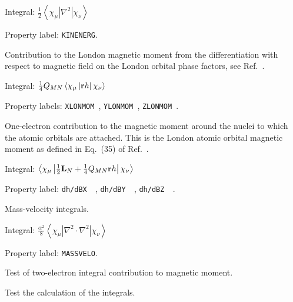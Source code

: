 \begin{description}
\begin{list}{}{}
\item Integral:
$\frac{1}{2}\left<\chi_{\mu}\left|\nabla^{2}\right|\chi_{\nu}\right>$
\item Property label: \verb|KINENERG|.
\end{list}

\item[\Key{LONMOM}] Contribution to the London magnetic
moment from
the differentiation with respect to magnetic field on the London
orbital phase factors, see Ref.~\cite{thpjjcp95}.

\begin{list}{}{}
\item Integral:
$\frac{1}{4}Q_{MN}\left<\chi_{\mu}\left|{\bf r}h\right|\chi_{\nu}\right>$
\item Property labels: \verb|XLONMOM |, \verb|YLONMOM |, \verb|ZLONMOM |.
\end{list}

\item[\Key{MAGMOM}] One-electron contribution to the magnetic
moment
around the nuclei to which the
atomic orbitals are attached. This is the London atomic
orbital
magnetic moment as defined in Eq.~(35) of
Ref.~\cite{krthklbpjhjajjcp99}.

\begin{list}{}{}
\item Integral:
$\left<\chi_{\mu}\left|\frac{1}{2}{\bf L}_N + \frac{1}{4}Q_{MN}{\bf
r}h\right|\chi_{\nu}\right>$
\item Property label: \verb|dh/dBX  |, \verb|dh/dBY  |, \verb|dh/dBZ  |.
\end{list}

\item[\Key{MASSVE}] Mass-velocity integrals.

\begin{list}{}{}
\item Integral:
$\frac{\alpha^2}{8}\left<\chi_{\mu}\left|\nabla^{2}\cdot\nabla^2\right|\chi_{\nu}\right>$
\item Property label: \verb|MASSVELO|.
\end{list}

\item[\Key{MGMO2T}] Test of two-electron integral contribution to
magnetic moment.

\item[\Key{MGMOMT}] Test the calculation of the 
integrals.


\end{description}
